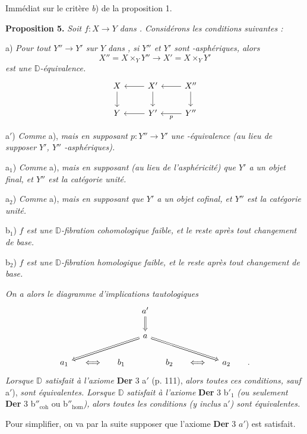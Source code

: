 \documentclass[11pt,leqno]{article}
\newcommand{\printedpage}[1]{\marginpar{\footnotesize p.~#1}}
\newcommand{\msp}[1]{\marginpar{\footnotesize [#1]}}
\newcommand{\Dia}{\mathsf{Dia}}
\newcommand{\Hot}{\mathsf{Hot}}
\newcommand{\D}{\mathbb{D}}
\begin{document}
Immédiat sur le critère \textit{b}) de la proposition 1.

\msp{page 117}\textbf{Proposition 5.} \textit{Soit $f : X \to Y$ dans \Dia. Considérons les conditions suivantes :}

a) \textit{Pour tout $Y'' \to Y'$ sur $Y$ dans \Dia, si $Y''$ et $Y'$ sont \Hot-asphériques, alors}
\[
X'' = X \times_Y Y'' \longrightarrow X' = X \times_Y Y'
\]
\textit{est une $\D$-équivalence.}
\[
\begin{tikzcd}
X & X' \arrow[l] & X'' \arrow[l] \\
Y \arrow[from=u] & Y' \arrow[l] \arrow[from=u] & Y'' \arrow[l, "p"] \arrow[from=u]
\end{tikzcd}
\]

a$'$) \textit{Comme} a), \textit{mais en supposant $p : Y'' \to Y'$ une \Hot-équivalence (au lieu de supposer $Y'$, $Y''$ \Hot-asphériques).}

a$_1$) \textit{Comme} a), \textit{mais en supposant (au lieu de l'asphéricité) que $Y'$ a un objet final, et $Y''$ est la catégorie unité.}

a$_2$) \textit{Comme} a), \textit{mais en supposant que $Y'$ a un objet cofinal, et $Y''$ est la catégorie unité.}

b$_1$) \textit{$f$ est une $\D$-fibration cohomologique faible, et le reste après tout changement de base.}

b$_2$) \textit{$f$ est une $\D$-fibration homologique faible, et le reste après tout changement de base.}

\printedpage{70}
\textit{On a alors le diagramme d'implications tautologiques}
\[
\begin{tikzcd}[column sep=small]
& & & a' \arrow[d, Rightarrow] & & & & \\
& & & a \arrow[dlll, Rightarrow] \arrow[drrr, Rightarrow] & & & & \\
a_1 & \Longleftrightarrow & b_1 & & b_2 & \Longleftrightarrow & a_2 & .
\end{tikzcd}
\]
\textit{Lorsque $\D$ satisfait à l'axiome} \textbf{Der} 3 a$'$ (p. 111), \textit{alors toutes ces conditions, sauf} a$'$), \textit{sont équivalentes. Lorsque $\D$ satisfait à l'axiome} \textbf{Der} 3 b$'_1$ \textit{(ou seulement} \textbf{Der} 3 b$''_{\mathrm{coh}}$ ou b$''_{\mathrm{hom}}$\textit{),} \textit{alors toutes les conditions (y inclus} a$'$\textit{) sont équivalentes.}

Pour simplifier, on va par la suite supposer que l'axiome \textbf{Der} 3 $a'$) est satisfait.
\end{document}
